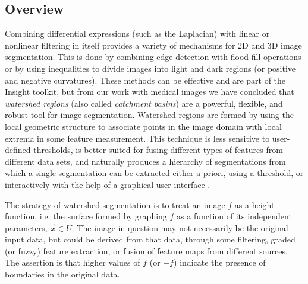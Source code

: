 %
%
%
%

\subsection{Overview}
\label{sec:AboutWatersheds}

Combining differential expressions (such as the Laplacian) with linear or
nonlinear filtering in itself provides a variety of mechanisms for 2D and 3D
image segmentation.  This is done by combining edge detection with flood-fill
operations or by using inequalities to divide images into light and dark
regions (or positive and negative curvatures).  These methods can be effective
and are part of the Insight toolkit, but from our work with medical images we
have concluded that {\em watershed regions} (also called {\em catchment
basins}) are a powerful, flexible, and robust tool for image segmentation.
Watershed regions are formed by using the local geometric structure to
associate points in the image domain with local extrema in some feature
measurement.  This technique is less sensitive to user-defined thresholds, is
better suited for fusing different types of features from different data sets,
and naturally produces a hierarchy of segmentations from which a single
segmentation can be extracted either a-priori, using a threshold, or
interactively with the help of a graphical user interface \cite{Yoo1992,Yoo1991}.

The strategy of watershed segmentation is to treat an image $f$ as a height
function, i.e.  the surface formed by graphing $f$ as a function of its
independent parameters, $\vec{x} \in U$.  The image in question may not
necessarily be the original input data, but could be derived from that data,
through some filtering, graded (or fuzzy) feature extraction, or fusion of
feature maps from different sources.  The assertion is that higher values of
$f$ (or $-f$) indicate the presence of boundaries in the original data.

